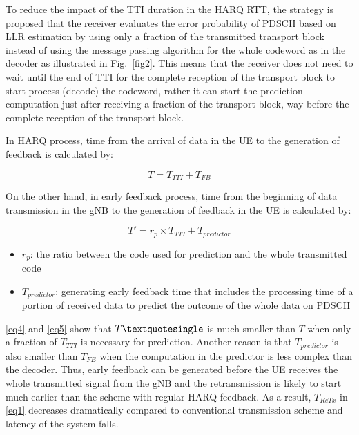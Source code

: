 \documentclass[conference]{IEEEtran}
\begin{document}
To reduce the impact of the TTI duration in the HARQ RTT, the strategy is proposed that the receiver evaluates the error probability of PDSCH based on LLR estimation by using only a fraction of the transmitted transport block instead of using the message passing algorithm for the whole codeword as in the decoder as illustrated in Fig.~\ref{fig2}. This means that the receiver does not need to wait until the end of TTI for the complete reception of the transport block to start process (decode) the codeword, rather it can start the prediction computation just after receiving a fraction of the transport block, way before the complete reception of the transport block.

In HARQ process, time from the arrival of data in the UE to the generation of feedback is calculated by:

\begin{equation}
T = T_{TTI} + T_{FB}\label{eq4}
\end{equation}

On the other hand, in early feedback process, time from the beginning of data transmission in the gNB to the generation of feedback in the UE is calculated by:

\begin{equation}
T' = r_{p}\times T_{TTI} + T_{predictor}\label{eq5}
\end{equation}

\begin{itemize}
    \item $r_{p}$: the ratio between the code used for prediction and the whole transmitted code
    \item $T_{predictor}$: generating early feedback time that includes the processing time of a portion of received data to predict the outcome of the whole data on PDSCH
\end{itemize}

\eqref{eq4} and \eqref{eq5} show that $T\textquotesingle$ is much smaller than $T$ when only a fraction of $T_{TTI}$ is necessary for prediction. Another reason is that $T_{predictor}$ is also smaller than $T_{FB}$ when the computation in the predictor is less complex than the decoder. Thus, early feedback can be generated before the UE receives the whole transmitted signal from the gNB and the retransmission is likely to start much earlier than the scheme with regular HARQ feedback. As a result, $T_{ReTx}$ in \eqref{eq1} decreases dramatically compared to conventional transmission scheme and latency of the system falls. 
\end{document}
